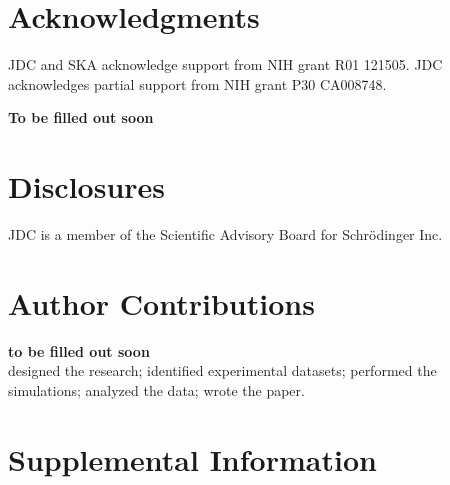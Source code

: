\documentclass[9pt,lineno]{elife-modified} %
\begin{document}
%
\newpage
%




\section{Acknowledgments}
JDC and SKA acknowledge support from NIH grant R01 121505.
JDC acknowledges partial support from NIH grant P30 CA008748.

\textbf{To be filled out soon}


\section{Disclosures}

JDC is a member of the Scientific Advisory Board for Schr\"{o}dinger Inc.


\section{Author Contributions}
\textbf{to be filled out soon} \\
 designed the research; 
 identified experimental datasets; 
 performed the simulations; 
 analyzed the data; 
 wrote the paper.

%
\newpage
%






%
%
%



%
%
\newpage
%
%





%
%
%
%
%
%
\newpage
\section{Supplemental Information}
\setcounter{figure}{0} 
\renewcommand{\figurename}{Supplemental Figure.}
\end{document}
